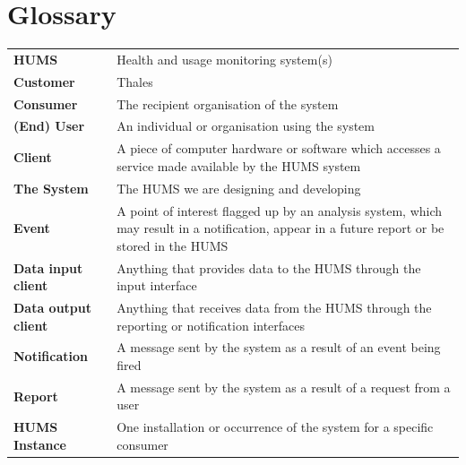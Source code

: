 \documentclass[10pt,a4paper]{article}
\begin{document}
\section{Glossary}
\begin{tabular}{p{3.5cm}p{13cm}}
\textbf{HUMS}			&	Health and usage monitoring system(s) \\
\textbf{Customer}		&	Thales \\
\textbf{Consumer}		&	The recipient organisation of the system \\
\textbf{(End) User}		&	An individual or organisation using the system \\
\textbf{Client}			&	A piece of computer hardware or software which accesses a service made available by the HUMS system \\
\textbf{The System}		&	The HUMS we are designing and developing \\
\textbf{Event}			&	A point of interest flagged up by an analysis system, which may result in a notification, appear in a future report or be stored in the HUMS \\
\textbf{Data input client}	&	Anything that provides data to the HUMS through the input interface \\
\textbf{Data output client}	&	Anything that receives data from the HUMS through the reporting or notification interfaces \\
\textbf{Notification}		&	A message sent by the system as a result of an event being fired \\
\textbf{Report}			&	A message sent by the system as a result of a request from a user \\
\textbf{HUMS Instance}	&	One installation or occurrence of the system for a specific consumer \\
\end{tabular}
\end{document}
